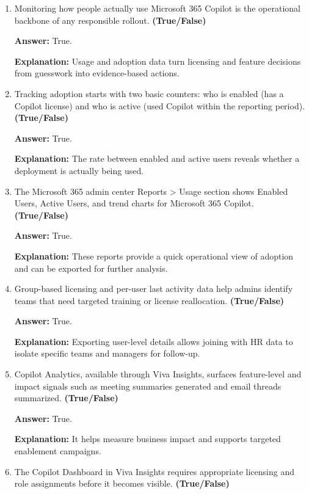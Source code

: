 \documentclass[10pt]{article}
\begin{document}
\begin{enumerate}[leftmargin=*]

\item Monitoring how people actually use Microsoft 365 Copilot is the operational backbone of any responsible rollout. \textbf{(True/False)}

\textbf{Answer:} True.

\textbf{Explanation:} Usage and adoption data turn licensing and feature decisions from guesswork into evidence-based actions.

\item Tracking adoption starts with two basic counters: who is enabled (has a Copilot license) and who is active (used Copilot within the reporting period). \textbf{(True/False)}

\textbf{Answer:} True.

\textbf{Explanation:} The rate between enabled and active users reveals whether a deployment is actually being used.

\item The Microsoft 365 admin center Reports > Usage section shows Enabled Users, Active Users, and trend charts for Microsoft 365 Copilot. \textbf{(True/False)}

\textbf{Answer:} True.

\textbf{Explanation:} These reports provide a quick operational view of adoption and can be exported for further analysis.

\item Group-based licensing and per-user last activity data help admins identify teams that need targeted training or license reallocation. \textbf{(True/False)}

\textbf{Answer:} True.

\textbf{Explanation:} Exporting user-level details allows joining with HR data to isolate specific teams and managers for follow-up.

\item Copilot Analytics, available through Viva Insights, surfaces feature-level and impact signals such as meeting summaries generated and email threads summarized. \textbf{(True/False)}

\textbf{Answer:} True.

\textbf{Explanation:} It helps measure business impact and supports targeted enablement campaigns.

\item The Copilot Dashboard in Viva Insights requires appropriate licensing and role assignments before it becomes visible. \textbf{(True/False)}


\end{enumerate}
\end{document}
